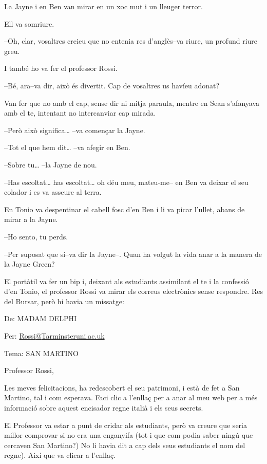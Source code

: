 La Jayne i en Ben van mirar en un xoc mut i un lleuger terror.

Ell va somriure.

--Oh, clar, vosaltres creieu que no entenia res d'anglès--va riure, un
profund riure greu.

I també ho va fer el professor Rossi.

--Bé, ara--va dir, això és divertit. Cap de vosaltres us havíeu adonat?

Van fer que no amb el cap, sense dir ni mitja paraula, mentre en Sean
s'afanyava amb el te, intentant no intercanviar cap mirada.

--Però això significa\ldots{} --va començar la Jayne.

--Tot el que hem dit\ldots{} --va afegir en Ben.

--Sobre tu\ldots{} --la Jayne de nou.

--Has escoltat\ldots{} has escoltat\ldots{} oh déu meu, mateu-me-- en
Ben va deixar el seu colador i es va asseure al terra.

En Tonio va despentinar el cabell fosc d'en Ben i li va picar l'ullet,
abans de mirar a la Jayne.

--Ho sento, tu perds.

--Per suposat que sí--va dir la Jayne--. Quan ha volgut la vida anar a
la manera de la Jayne Green?

El portàtil va fer un bip i, deixant als estudiants assimilant el te i
la confessió d'en Tonio, el professor Rossi va mirar els correus
electrònics sense respondre. Res del Bursar, però hi havia un missatge:

De: MADAM DELPHI

Per:
\href{mailto:Rossi@Tarminsteruni.ac.uk}{Rossi}\href{mailto:Rossi@Tarminsteruni.ac.uk}{@}\href{mailto:Rossi@Tarminsteruni.ac.uk}{Tarminsteruni.ac.uk}

Tema: SAN MARTINO

Professor Rossi,

Les meves felicitacions, ha redescobert el seu patrimoni, i està de fet
a San Martino, tal i com esperava. Faci clic a l'enllaç per a anar al
meu web per a més informació sobre aquest encisador regne italià i els
seus secrets.

El Professor va estar a punt de cridar als estudiants, però va creure
que seria millor comprovar si no era una enganyifa (tot i que com podia
saber ningú que cercaven San Martino?) No li havia dit a cap dels seus
estudiants el nom del regne). Així que va clicar a l'enllaç.

